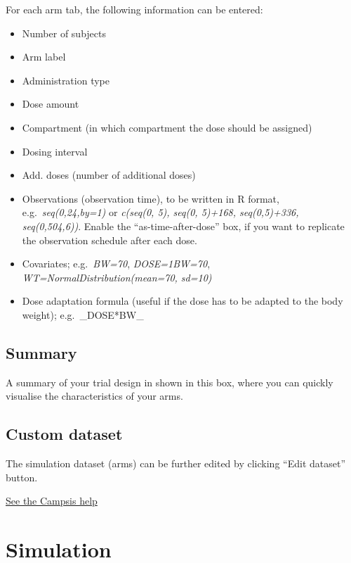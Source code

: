 \documentclass[
]{book}
\providecommand{\tightlist}{%
  \setlength{\itemsep}{0pt}\setlength{\parskip}{0pt}}
\theoremstyle{definition}
\theoremstyle{definition}
\theoremstyle{definition}
\theoremstyle{definition}
\theoremstyle{remark}
\begin{document}
For each arm tab, the following information can be entered:

\begin{itemize}
\tightlist
\item
  Number of subjects
\item
  Arm label
\item
  Administration type
\item
  Dose amount
\item
  Compartment (in which compartment the dose should be assigned)
\item
  Dosing interval
\item
  Add. doses (number of additional doses)
\item
  Observations (observation time), to be written in R format, e.g.~\emph{seq(0,24,by=1)} or \emph{c(seq(0, 5), seq(0, 5)+168, seq(0,5)+336, seq(0,504,6))}. Enable the ``as-time-after-dose'' box, if you want to replicate the observation schedule after each dose.
\item
  Covariates; e.g.~\emph{BW=70}, \emph{DOSE=1\textbar BW=70}, \emph{WT=NormalDistribution(mean=70, sd=10)}
\item
  Dose adaptation formula (useful if the dose has to be adapted to the body weight); e.g.~\_DOSE*BW\_
\end{itemize}

\hypertarget{summary}{%
\section{Summary}\label{summary}}

A summary of your trial design in shown in this box, where you can quickly visualise the characteristics of your arms.

\hypertarget{custom-dataset}{%
\section{Custom dataset}\label{custom-dataset}}

The simulation dataset (arms) can be further edited by clicking ``Edit dataset'' button.

\href{https://calvagone.github.io/campsis.doc/articles/v01_dataset.html}{See the Campsis help}

\hypertarget{simulation}{%
\chapter{Simulation}\label{simulation}}
\end{document}
